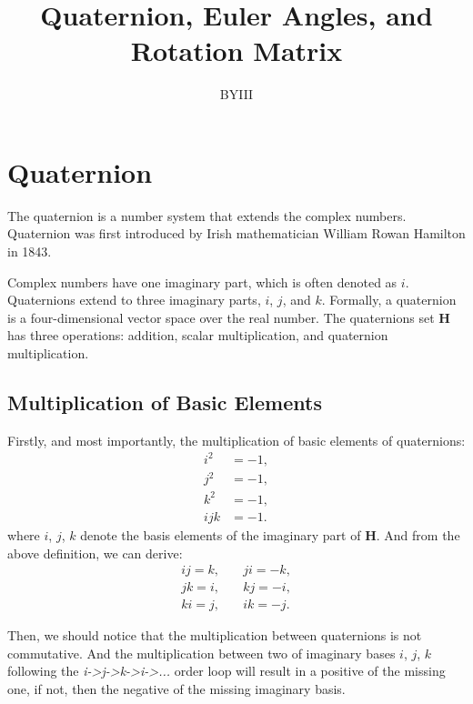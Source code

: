 \documentclass{article}
\begin{document}
\author{BYIII}
\title{Quaternion, Euler Angles, and Rotation Matrix}
\date{}

\maketitle

\section{Quaternion}

The quaternion is a number system that extends the complex numbers. Quaternion was first introduced by Irish mathematician William Rowan Hamilton in 1843.

Complex numbers have one imaginary part, which is often denoted as $i$. Quaternions extend to three imaginary parts, $i$, $j$, and $k$. Formally, a quaternion is a four-dimensional vector space over the real number. The quaternions set \textbf{H} has three operations: addition, scalar multiplication, and quaternion multiplication.

\subsection{Multiplication of Basic Elements}

Firstly, and most importantly, the multiplication of basic elements of quaternions:
\begin{equation}
  \begin{split}
    i^2 &= -1, \\
    j^2 &= -1, \\
    k^2 &= -1, \\
    ijk &= -1.
  \end{split}
\end{equation}
where $i$, $j$, $k$ denote the basis elements of the imaginary part of \textbf{H}. And from the above definition, we can derive:
\begin{equation}
  \begin{split}
    ij = k, &\quad ji = -k, \\
    jk = i, &\quad kj = -i, \\
    ki = j, &\quad ik = -j.
  \end{split}
\end{equation}

Then, we should notice that the multiplication between quaternions is not commutative. And the multiplication between two of imaginary bases $i$, $j$, $k$ following the \textit{i->j->k->i->...} order loop will result in a positive of the missing one, if not, then the negative of the missing imaginary basis.
\end{document}
